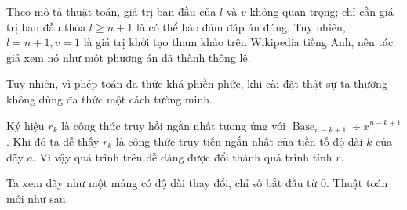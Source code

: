 \documentclass[11pt]{article}
\newcommand{\Base}{\operatorname{Base}}
\begin{document}
Theo mô tả thuật toán, giá trị ban đầu của \(l\) và \(v\) không quan trọng;
chỉ cần giá trị ban đầu thỏa \(l\ge n+1\) là có thể bảo đảm đáp án đúng. Tuy
nhiên, \(l=n+1, v=1\) là giá trị khởi tạo tham khảo trên Wikipedia tiếng Anh,
nên tác giả xem nó như một phương án đã thành thông lệ.

Tuy nhiên, vì phép toán đa thức khá phiền phức, khi cài đặt thật sự ta thường
không dùng đa thức một cách tường minh.

Ký hiệu \(r_k\) là công thức truy hồi ngắn nhất tương ứng với
\(\Base_{n-k+1}\div x^{n-k+1}\). Khi đó ta dễ thấy \(r_k\) là công thức truy
tiến ngắn nhất của tiền tố độ dài \(k\) của dãy \(a\). Vì vậy quá trình trên
dễ dàng được đổi thành quá trình tính \(r\).

Ta xem dãy như một mảng có độ dài thay đổi, chỉ số bắt đầu từ \(0\). Thuật toán
mới như sau.
\end{document}
